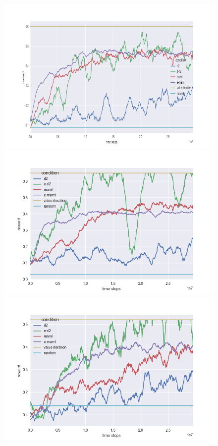 \begin{figure}[H]
\begin{center}
\includegraphics[scale=0.335]{bradly_curves/64testgrid0_scaled.png}%
\includegraphics[scale=0.335]{bradly_curves/64testgrid1.png} \\
\includegraphics[scale=0.335]{bradly_curves/64testgrid2.png}%

\end{center}
\end{figure}
